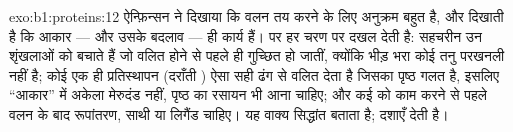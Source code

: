 \begin{solution}{exo:b1:proteins:12}
ऐन्फ़िन्सन ने दिखाया कि वलन तय करने के लिए अनुक्रम बहुत है, और
 दिखाती है कि आकार --- और उसके बदलाव --- ही कार्य हैं।
पर  हर चरण पर दखल देती है: सहचरीन उन शृंखलाओं को बचाते हैं जो
वलित होने से पहले ही गुच्छित हो जातीं, क्योंकि भीड़ भरा  कोई
तनु परखनली नहीं है; कोई एक ही प्रतिस्थापन (दराँती ) ऐसा
सही ढंग से वलित  देता है जिसका पृष्ठ गलत है, इसलिए ``आकार'' में
अकेला मेरुदंड नहीं, पृष्ठ का रसायन भी आना चाहिए; और कई
 को काम करने से पहले वलन के बाद रूपांतरण, साथी या लिगैंड चाहिए।
यह वाक्य सिद्धांत बताता है;  दशाएँ देती है।
\end{solution}

